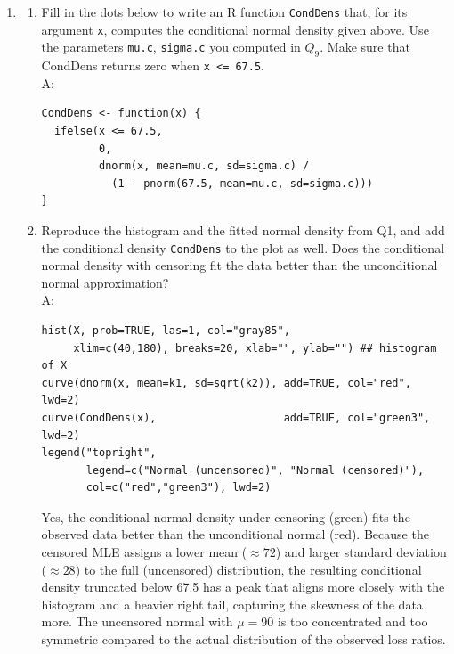 \documentclass{article}
\begin{document}
\begin{enumerate}
  \item[$\boldsymbol{Q_{10}}$]
  \begin{enumerate}
    \item[(a)] Fill in the dots below to write an R function \texttt{CondDens} that, for its argument \texttt{x}, computes the conditional normal density given above. Use the parameters \texttt{mu.c}, \texttt{sigma.c} you computed in $Q_9$. Make sure that CondDens returns zero when \texttt{x <= 67.5}. \\A:

\begin{lstlisting}
CondDens <- function(x) {
  ifelse(x <= 67.5,
         0,
         dnorm(x, mean=mu.c, sd=sigma.c) /
           (1 - pnorm(67.5, mean=mu.c, sd=sigma.c)))
}
\end{lstlisting}

    \item[(b)] Reproduce the histogram and the fitted normal density from Q1, and add the conditional density \texttt{CondDens} to the plot as well. Does the conditional normal density with censoring fit the data better than the unconditional normal approximation? \\A:

\begin{lstlisting}
hist(X, prob=TRUE, las=1, col="gray85",
     xlim=c(40,180), breaks=20, xlab="", ylab="") ## histogram of X
curve(dnorm(x, mean=k1, sd=sqrt(k2)), add=TRUE, col="red",   lwd=2)
curve(CondDens(x),                    add=TRUE, col="green3", lwd=2)
legend("topright",
       legend=c("Normal (uncensored)", "Normal (censored)"),
       col=c("red","green3"), lwd=2)
\end{lstlisting}

      Yes, the conditional normal density under censoring (green) fits the observed data better than the unconditional normal (red). Because the censored MLE assigns a lower mean ($\approx 72$) and larger standard deviation ($\approx 28$) to the full (uncensored) distribution, the resulting conditional density truncated below 67.5 has a peak that aligns more closely with the histogram and a heavier right tail, capturing the skewness of the data more. The uncensored normal with $\mu = 90$ is too concentrated and too symmetric compared to the actual distribution of the observed loss ratios.
  \end{enumerate}
\end{enumerate}
\end{document}
